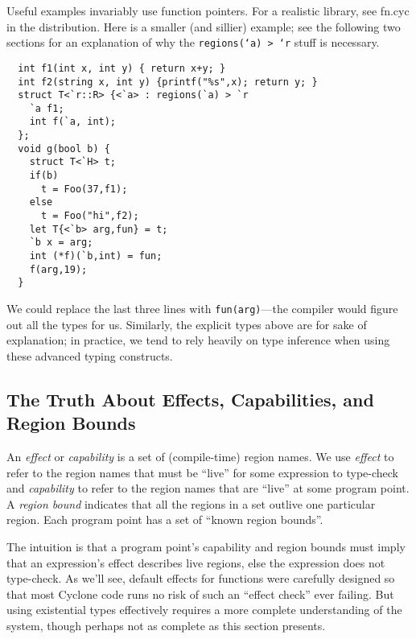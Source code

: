 Useful examples invariably use function pointers.  For a realistic
library, see fn.cyc in the distribution.  Here is a smaller (and
sillier) example; see the following two sections for an
explanation of why the \texttt{regions(`a) > `r} stuff is necessary.
\begin{verbatim}
  int f1(int x, int y) { return x+y; }
  int f2(string x, int y) {printf("%s",x); return y; }
  struct T<`r::R> {<`a> : regions(`a) > `r 
    `a f1; 
    int f(`a, int); 
  };
  void g(bool b) {
    struct T<`H> t;
    if(b)
      t = Foo(37,f1);
    else
      t = Foo("hi",f2);
    let T{<`b> arg,fun} = t;
    `b x = arg;
    int (*f)(`b,int) = fun;
    f(arg,19);
  }
\end{verbatim}

We could replace the last three lines with \texttt{fun(arg)}---the
compiler would figure out all the types for us.  Similarly, the
explicit types above are for sake of explanation; in practice, we tend
to rely heavily on type inference when using these advanced typing
constructs.

\subsection{The Truth About Effects, Capabilities, and Region Bounds}

An \emph{effect} or \emph{capability} is a set of (compile-time)
region names.  We use \emph{effect} to refer to the region names that
must be ``live'' for some expression to type-check and
\emph{capability} to refer to the region names that are ``live'' at
some program point.  A \emph{region bound} indicates that all the
regions in a set outlive one particular region.  Each program point
has a set of ``known region bounds''.  

The intuition is that a program point's capability and region bounds
must imply that an expression's effect describes live regions, else
the expression does not type-check.  As we'll see, default effects for
functions were carefully designed so that most Cyclone code runs no
risk of such an ``effect check'' ever failing.  But using existential
types effectively requires a more complete understanding of the
system, though perhaps not as complete as this section presents.

